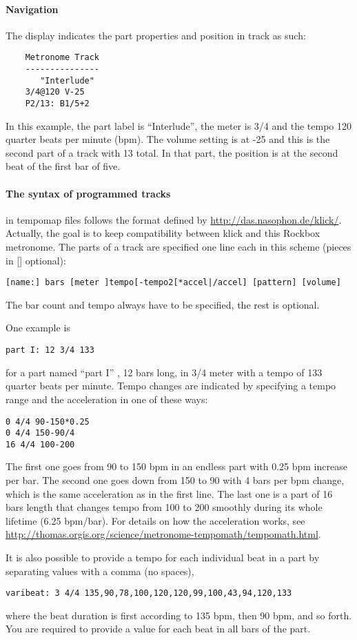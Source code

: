 \paragraph{Navigation}
The display indicates the part properties and position in track as such:
\begin{verbatim}
    Metronome Track
    ---------------
       "Interlude"
    3/4@120 V-25
    P2/13: B1/5+2
\end{verbatim}
In this example, the part label is ``Interlude'', the meter is 3/4 and
the tempo 120 quarter beats per minute (bpm). The volume setting is at -25
and this is the second part of a track with 13 total. In that part,
the position is at the second beat of the first bar of five.

\paragraph{The syntax of programmed tracks}
in tempomap files follows the format defined by
\url{http://das.nasophon.de/klick/}.
Actually, the goal is to keep compatibility between klick and this
Rockbox metronome.
The parts of a track are specified one line each in this scheme
(pieces in [] optional):
\begin{verbatim}
[name:] bars [meter ]tempo[-tempo2[*accel|/accel] [pattern] [volume]
\end{verbatim}
The bar count and tempo always have to be specified, the rest is optional.

One example is
\begin{verbatim}
part I: 12 3/4 133
\end{verbatim}
for a part named ``part I'' , 12 bars long, in 3/4 meter with
a tempo of 133 quarter beats per minute.
Tempo changes are indicated by specifying a tempo range and the
acceleration in one of these ways:
\begin{verbatim}
0 4/4 90-150*0.25
0 4/4 150-90/4
16 4/4 100-200
\end{verbatim}
The first one goes from 90 to 150 bpm in an endless part with 0.25 bpm
increase per bar. The second one goes down from 150 to 90 with
4 bars per bpm change, which is the same acceleration as in the first line.
The last one is a part of 16 bars length that changes tempo from 100 to 200
smoothly during its whole lifetime (6.25 bpm/bar). For details on how the
acceleration works, see
\url{http://thomas.orgis.org/science/metronome-tempomath/tempomath.html}.

It is also possible to provide a tempo for each individual beat in a part
by separating values with a comma (no spaces),
\begin{verbatim}
varibeat: 3 4/4 135,90,78,100,120,120,99,100,43,94,120,133
\end{verbatim}
where the beat duration is first according to 135 bpm, then 90 bpm,
and so forth. You are required to provide a value for each beat
in all bars of the part.

